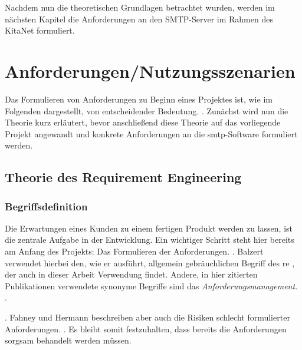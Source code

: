 Nachdem nun die theoretischen Grundlagen betrachtet wurden, werden im nächsten Kapitel die Anforderungen an den SMTP-Server im Rahmen des KitaNet formuliert. 





\chapter{Anforderungen/Nutzungsszenarien}

Das Formulieren von Anforderungen zu Beginn eines Projektes ist, wie im Folgenden dargestellt, von entscheidender Bedeutung.  \citep[][77]{Hull2010}. Zunächst wird nun die Theorie kurz erläutert, bevor anschließend diese Theorie auf das vorliegende Projekt angewandt und konkrete Anforderungen an die \ac{smtp}-Software formuliert werden.

\section{Theorie des Requirement Engineering}

\subsection{Begriffsdefinition}

Die Erwartungen eines Kunden zu einem fertigen Produkt werden zu lassen, ist die zentrale Aufgabe in der Entwicklung. Ein wichtiger Schritt steht hier bereits am Anfang des Projekts: Das Formulieren der Anforderungen.
 \citep[][434]{Balzert2010}. 
Balzert verwendet hierbei den, wie er ausführt, allgemein gebräuchlichen Begriff des \ac{re} \citep[vgl.][434]{Balzert2010}, der auch in dieser Arbeit Verwendung findet. Andere, in hier zitierten Publikationen verwendete synonyme Begriffe sind \zb das \textit{Anforderungsmanagement}.
 \citep[][6]{Grande2014}.

 \citep[Fahney und Hermann in][10]{Herrmann2013}.
Fahney und Hermann beschreiben aber auch die Risiken schlecht formulierter Anforderungen.  \citep[Fahney und Hermann in][10]{Herrmann2013}. 
Es bleibt somit festzuhalten, dass bereits die Anforderungen sorgsam behandelt werden müssen.


